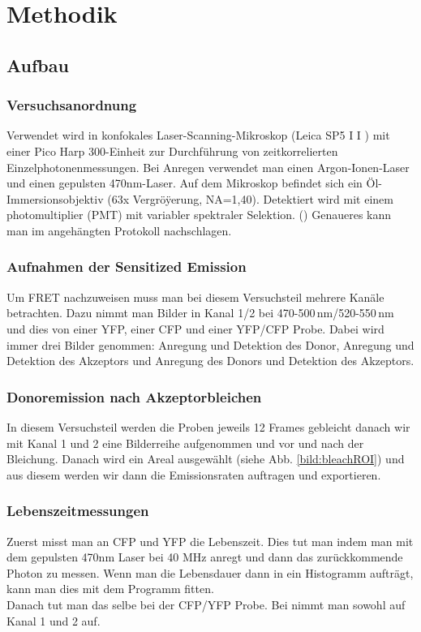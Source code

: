 
\chapter{Methodik}

\section{Aufbau}

\subsection{Versuchsanordnung}

Verwendet wird in konfokales Laser-Scanning-Mikroskop (Leica SP5 I I ) mit einer Pico Harp
300-Einheit zur Durchführung von zeitkorrelierten Einzelphotonenmessungen. Bei Anregen verwendet man einen Argon-Ionen-Laser 
und einen gepulsten 470nm-Laser. Auf dem Mikroskop befindet sich ein Öl-Immersionsobjektiv (63x Vergröÿerung, NA=1,40). Detektiert wird 
mit einem photomultiplier (PMT) mit variabler spektraler Selektion. (\cite{FRETSkript})
Genaueres kann man im angehängten Protokoll nachschlagen.

\subsection{Aufnahmen der Sensitized Emission}

Um FRET nachzuweisen muss man bei diesem Versuchsteil mehrere Kanäle betrachten. Dazu nimmt man Bilder in Kanal 1/2 
bei 470-500\,nm/520-550\,nm und dies von einer YFP, einer CFP und einer YFP/CFP Probe. Dabei wird immer drei Bilder 
genommen: Anregung und Detektion des Donor, Anregung und Detektion des Akzeptors und Anregung des Donors und Detektion des Akzeptors.


\subsection{Donoremission nach Akzeptorbleichen}

In diesem Versuchsteil werden die Proben jeweils 12 Frames gebleicht danach wir mit Kanal 1 und 2 eine Bilderreihe 
aufgenommen und vor und nach der Bleichung. Danach wird ein Areal ausgewählt (siehe Abb. \ref{bild:bleachROI}) und aus 
diesem werden wir dann die Emissionsraten auftragen und exportieren. 

\subsection{Lebenszeitmessungen}

Zuerst misst man an CFP und YFP die Lebenszeit. Dies tut man indem man mit dem gepulsten 470nm Laser bei 40 MHz anregt und dann das zurückkommende Photon zu messen. 
Wenn man die Lebensdauer dann in ein Histogramm aufträgt, kann man dies mit dem Programm fitten.\\
Danach tut man das selbe bei der CFP/YFP Probe. Bei nimmt man sowohl auf Kanal 1 und 2 auf.